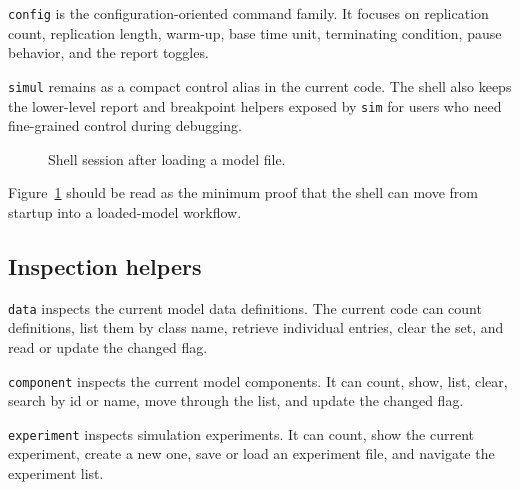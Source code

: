\texttt{config} is the configuration-oriented command family. It focuses on
replication count, replication length, warm-up, base time unit, terminating
condition, pause behavior, and the report toggles.

\texttt{simul} remains as a compact control alias in the current code. The
shell also keeps the lower-level report and breakpoint helpers exposed by
\texttt{sim} for users who need fine-grained control during debugging.

\begin{figure}[htbp]
\centering
\caption{Shell session after loading a model file.}
\label{fig:shell-model-loaded}
\end{figure}

Figure~\ref{fig:shell-model-loaded} should be read as the minimum proof that
the shell can move from startup into a loaded-model workflow.

\subsection{Inspection helpers}
\label{subsec:shell-inspection}

\texttt{data} inspects the current model data definitions. The current code can
count definitions, list them by class name, retrieve individual entries, clear
the set, and read or update the changed flag.

\texttt{component} inspects the current model components. It can count, show,
list, clear, search by id or name, move through the list, and update the
changed flag.

\texttt{experiment} inspects simulation experiments. It can count, show the
current experiment, create a new one, save or load an experiment file, and
navigate the experiment list.

